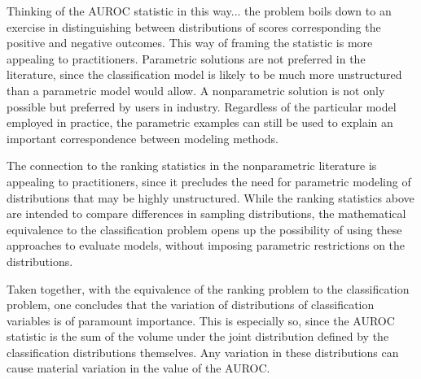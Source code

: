 
Thinking of the AUROC statistic in this way... the problem boils down to an exercise in distinguishing between distributions of scores corresponding the positive and negative outcomes. 
This way of framing the statistic is more appealing to practitioners. 
Parametric solutions are not preferred in the literature, since the classification model is likely to be much more unstructured than a parametric model would allow.
A nonparametric solution is not only possible but preferred by users in industry.
Regardless of the particular model employed in practice, the parametric examples can still be used to explain an important correspondence between modeling methods.




The connection to the ranking statistics in the nonparametric literature is appealing to practitioners, since it precludes the need for parametric modeling of distributions that may be highly unstructured.
While the ranking statistics above are intended to compare differences in sampling distributions, the mathematical equivalence to the classification problem opens up the possibility of using these approaches to evaluate models, without imposing parametric restrictions on the distributions.


Taken together, with the equivalence of the ranking problem to the classification problem,
%
one concludes that the variation of distributions of classification variables is of paramount importance.
This is especially so, since the AUROC statistic is the sum of the volume under the joint distribution defined by the classification distributions themselves.
Any variation in these distributions can cause material variation in the value of the AUROC.



